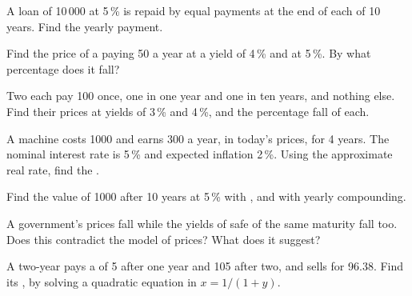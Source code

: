 \begin{exercise}[$\star\star$]\label{exo:g12:present-value:7}
A loan of 10\,000 at 5\,\% is repaid by equal payments at the end of each of 10 years. Find the yearly payment.
\end{exercise}

\begin{exercise}[$\star\star$]\label{exo:g12:present-value:8}
Find the price of a  paying 50 a year at a yield of 4\,\% and at 5\,\%. By what percentage does it fall?
\end{exercise}

\begin{exercise}[$\star\star$]\label{exo:g12:present-value:9}
Two  each pay 100 once, one in one year and one in ten years, and nothing else. Find their prices at yields of 3\,\% and 4\,\%, and the percentage fall of each.
\end{exercise}

\begin{exercise}[$\star\star$]\label{exo:g12:present-value:10}
A machine costs 1000 and earns 300 a year, in today's prices, for 4 years. The nominal interest rate is 5\,\% and expected inflation 2\,\%. Using the approximate real rate,
find the .
\end{exercise}

\begin{exercise}[$\star\star$]\label{exo:g12:present-value:11}
Find the value of 1000 after 10 years at 5\,\% with , and with yearly compounding.
\end{exercise}

\begin{exercise}[$\star\star\star$]\label{exo:g12:present-value:12}
A government's  prices fall while the yields of safe  of the same maturity fall too. Does this contradict the model of  prices? What does it suggest?
\end{exercise}

\begin{exercise}[$\star\star\star$]\label{exo:g12:present-value:13}
A two-year  pays a  of 5 after one year and 105 after two, and sells for 96.38. Find its , by solving a quadratic equation in $x = 1/(1 + y)$.
\end{exercise}

